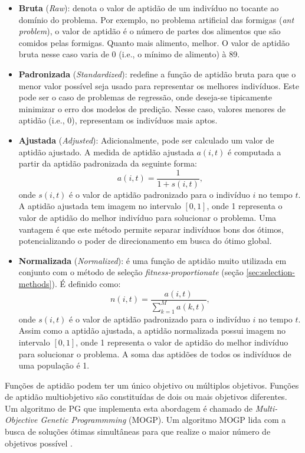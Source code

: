 \begin{itemize}
    \item \textbf{Bruta} (\textit{Raw}): denota o valor de aptidão de um indivíduo no tocante ao domínio do problema. Por exemplo, no problema artificial das formigas (\textit{ant problem}), o valor de aptidão é o número de partes dos alimentos que são comidos pelas formigas. Quanto mais alimento, melhor. O valor de aptidão bruta nesse caso varia de 0 (i.e., o mínimo de alimento) à 89.
    \item \textbf{Padronizada} (\textit{Standardized}): redefine a função de aptidão bruta para que o menor valor possível seja usado para representar os melhores indivíduos. Este pode ser o caso de problemas de regressão, onde deseja-se tipicamente minimizar o erro dos modelos de predição. Nesse caso, valores menores de aptidão (i.e., 0), representam os indivíduos mais aptos.
    \item \textbf{Ajustada} (\textit{Adjusted}): Adicionalmente, pode ser calculado um valor de aptidão ajustado. A medida de aptidão ajustada $a(i,t)$ é computada a partir da aptidão padronizada da seguinte forma:
        \[ a(i,t) = \frac{1}{1 + s(i,t)}, \]
    onde $s(i,t)$ é o valor de aptidão padronizado para o indivíduo $i$ no tempo $t$. A aptidão ajustada tem imagem no intervalo $[0, 1]$, onde 1 representa o valor de aptidão do melhor indivíduo para solucionar o problema. Uma vantagem é que este método permite separar indivíduos bons dos ótimos, potencializando o poder de direcionamento em busca do ótimo global.
    \item \textbf{Normalizada} (\textit{Normalized}): é uma função de aptidão muito utilizada em conjunto com o método de seleção \textit{fitness-proportionate} (seção \ref{sec:selection-methods}). É definido como:
        \[ n(i,t) = \frac{a(i,t)}{\sum_{k=1}^{M}{a(k,t)}}, \]
    onde $s(i,t)$ é o valor de aptidão padronizado para o indivíduo $i$ no tempo $t$. Assim como a aptidão ajustada, a aptidão normalizada possui imagem no intervalo $[0, 1]$, onde 1 representa o valor de aptidão do melhor indivíduo para solucionar o problema. A soma das aptidões de todos os indivíduos de uma população é 1.
\end{itemize}

Funções de aptidão podem ter um único objetivo ou múltiplos objetivos. Funções de aptidão multiobjetivo são constituídas de dois ou mais objetivos diferentes. Um algoritmo de PG que implementa esta abordagem é chamado de \textit{Multi-Objective Genetic Programmming} (MOGP). Um algoritmo MOGP lida com a busca de soluções ótimas simultâneas para que realize o maior número de objetivos possível \cite{poli2008}.

